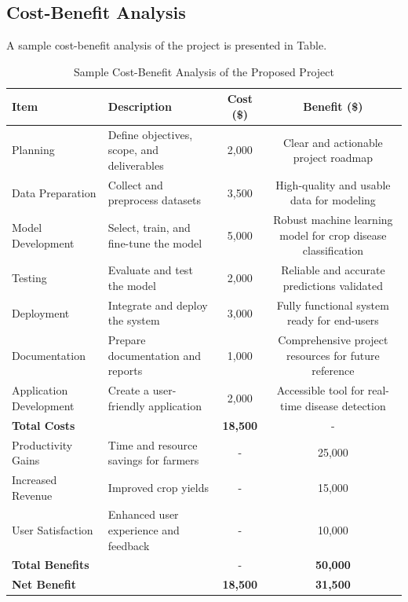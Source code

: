 \subsection{Cost-Benefit Analysis}
A sample cost-benefit analysis of the project is presented in Table.
\begin{table}[h]
    \centering
    \caption{Sample Cost-Benefit Analysis of the Proposed Project}
    \label{tab:cost-benefit}
    \begin{tabular}{|l|p{6cm}|c|c|}
        \hline
        \textbf{Item} & \textbf{Description} & \textbf{Cost (\$)} & \textbf{Benefit (\$)} \\ \hline
        Planning & Define objectives, scope, and deliverables & 2,000 & Clear and actionable project roadmap \\ \hline
        Data Preparation & Collect and preprocess datasets & 3,500 & High-quality and usable data for modeling \\ \hline
        Model Development & Select, train, and fine-tune the model & 5,000 & Robust machine learning model for crop disease classification \\ \hline
        Testing & Evaluate and test the model & 2,000 & Reliable and accurate predictions validated \\ \hline
        Deployment & Integrate and deploy the system & 3,000 & Fully functional system ready for end-users \\ \hline
        Documentation & Prepare documentation and reports & 1,000 & Comprehensive project resources for future reference \\ \hline
        Application Development & Create a user-friendly application & 2,000 & Accessible tool for real-time disease detection \\ \hline
        \textbf{Total Costs} &  & \textbf{18,500} & - \\ \hline
        Productivity Gains & Time and resource savings for farmers & - & 25,000 \\ \hline
        Increased Revenue & Improved crop yields & - & 15,000 \\ \hline
        User Satisfaction & Enhanced user experience and feedback & - & 10,000 \\ \hline
        \textbf{Total Benefits} &  & - & \textbf{50,000} \\ \hline
        \textbf{Net Benefit} &  & \textbf{18,500} & \textbf{31,500} \\ \hline
    \end{tabular}
\end{table}



